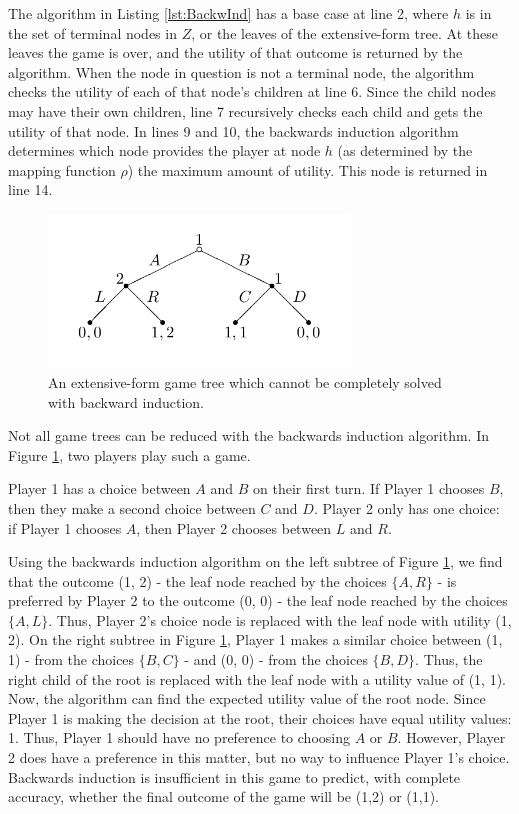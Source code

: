 The algorithm in Listing \ref{lst:BackwInd} has a base case at line 2, where $h$ is in the set of terminal nodes in $Z$, or the leaves of the extensive-form tree. At these leaves the game is over, and the utility of that outcome is returned by the algorithm. When the node in question is not a terminal node, the algorithm checks the utility of each of that node's children at line 6. Since the child nodes may have their own children, line 7 recursively checks each child and gets the utility of that node. In lines 9 and 10, the backwards induction algorithm determines which node provides the player at node $h$ (as determined by the mapping function $\rho$) the maximum amount of utility. This node is returned in line 14.\\

\begin{figure}[H]
  \centering
  \includegraphics[width=8cm]{figures/NoBackward.png}
  \caption{An extensive-form game tree which cannot be completely solved with backward induction.}
  \label{fig:noBackward}
\end{figure}

Not all game trees can be reduced with the backwards induction algorithm. In Figure \ref{fig:noBackward}, two players play such a game.

\begin{exmp}
  Player 1 has a choice between $A$ and $B$ on their first turn. If Player 1 chooses $B$, then they make a second choice between $C$ and $D$. Player 2 only has one choice: if Player 1 chooses $A$, then Player 2 chooses between $L$ and $R$.
\end{exmp}
Using the backwards induction algorithm on the left subtree of Figure \ref{fig:noBackward}, we find that the outcome (1, 2) - the leaf node reached by the choices $\{A, R\}$ - is preferred by Player 2 to the outcome (0, 0) - the leaf node reached by the choices $\{A, L\}$. Thus, Player 2's choice node is replaced with the leaf node with utility (1, 2). On the right subtree in Figure \ref{fig:noBackward}, Player 1 makes a similar choice between (1, 1) - from the choices $\{B, C\}$ - and (0, 0) - from the choices $\{B, D\}$. Thus, the right child of the root is replaced with the leaf node with a utility value of (1, 1). Now, the algorithm can find the expected utility value of the root node. Since Player 1 is making the decision at the root, their choices have equal utility values: 1. Thus, Player 1 should have no preference to choosing $A$ or $B$. However, Player 2 does have a preference in this matter, but no way to influence Player 1's choice. Backwards induction is insufficient in this game to predict, with complete accuracy, whether the final outcome of the game will be (1,2) or (1,1).

